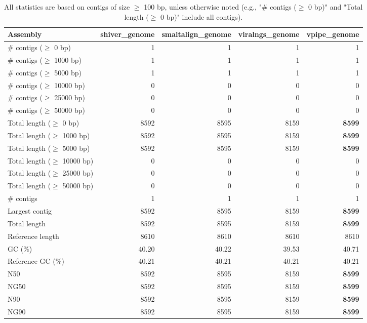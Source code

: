 \documentclass[12pt,a4paper]{article}
\begin{document}
\begin{table}[ht]
\begin{center}
\caption{All statistics are based on contigs of size $\geq$ 100 bp, unless otherwise noted (e.g., "\# contigs ($\geq$ 0 bp)" and "Total length ($\geq$ 0 bp)" include all contigs).}
\begin{tabular}{|l*{4}{|r}|}
\hline
Assembly & shiver\_genome & smaltalign\_genome & viralngs\_genome & vpipe\_genome \\ \hline
\# contigs ($\geq$ 0 bp) & 1 & 1 & 1 & 1 \\ \hline
\# contigs ($\geq$ 1000 bp) & 1 & 1 & 1 & 1 \\ \hline
\# contigs ($\geq$ 5000 bp) & 1 & 1 & 1 & 1 \\ \hline
\# contigs ($\geq$ 10000 bp) & 0 & 0 & 0 & 0 \\ \hline
\# contigs ($\geq$ 25000 bp) & 0 & 0 & 0 & 0 \\ \hline
\# contigs ($\geq$ 50000 bp) & 0 & 0 & 0 & 0 \\ \hline
Total length ($\geq$ 0 bp) & 8592 & 8595 & 8159 & {\bf 8599} \\ \hline
Total length ($\geq$ 1000 bp) & 8592 & 8595 & 8159 & {\bf 8599} \\ \hline
Total length ($\geq$ 5000 bp) & 8592 & 8595 & 8159 & {\bf 8599} \\ \hline
Total length ($\geq$ 10000 bp) & 0 & 0 & 0 & 0 \\ \hline
Total length ($\geq$ 25000 bp) & 0 & 0 & 0 & 0 \\ \hline
Total length ($\geq$ 50000 bp) & 0 & 0 & 0 & 0 \\ \hline
\# contigs & 1 & 1 & 1 & 1 \\ \hline
Largest contig & 8592 & 8595 & 8159 & {\bf 8599} \\ \hline
Total length & 8592 & 8595 & 8159 & {\bf 8599} \\ \hline
Reference length & 8610 & 8610 & 8610 & 8610 \\ \hline
GC (\%) & 40.20 & 40.22 & 39.53 & 40.71 \\ \hline
Reference GC (\%) & 40.21 & 40.21 & 40.21 & 40.21 \\ \hline
N50 & 8592 & 8595 & 8159 & {\bf 8599} \\ \hline
NG50 & 8592 & 8595 & 8159 & {\bf 8599} \\ \hline
N90 & 8592 & 8595 & 8159 & {\bf 8599} \\ \hline
NG90 & 8592 & 8595 & 8159 & {\bf 8599} \\ \hline

\end{tabular}
\end{center}
\end{table}
\end{document}
